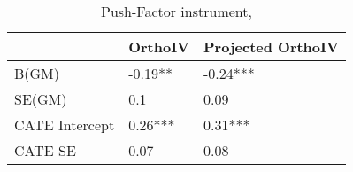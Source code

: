 \begin{table}\centering\caption{Push-Factor instrument, }\begin{tabular}{lll}
\toprule
                & OrthoIV   & Projected OrthoIV   \\
\midrule
 B(GM)          & -0.19**   & -0.24***            \\
 SE(GM)         & 0.1       & 0.09                \\
 CATE Intercept & 0.26***   & 0.31***             \\
 CATE SE        & 0.07      & 0.08                \\
\bottomrule
\end{tabular}\end{table}